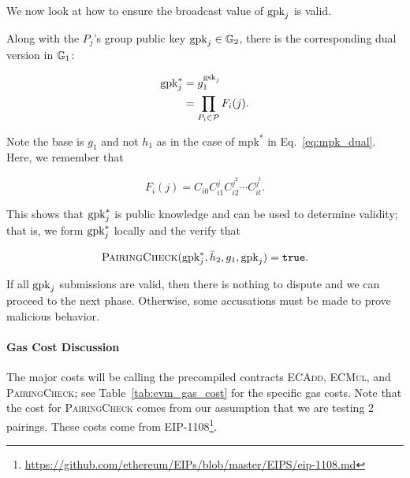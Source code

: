 \subsubsection{\GPKDispute{}}
\label{sssec:gpkj_dispute}
We now look at how to ensure the broadcast value of
$\textrm{gpk}_{j}$ is valid.

Along with the $P_{j}$'s group public key $\textrm{gpk}_{j}\in\mathbb{G}_{2}$,
there is the corresponding dual version in $\mathbb{G}_{1}$:

\begin{align}
    \textrm{gpk}_{j}^{*} &= g_{1}^{\textrm{gsk}_{j}}
            \nonumber\\
        &= \prod_{P_{i}\in\mathcal{P}}F_{i}(j).
    \label{eq:gpkj_star_def}
\end{align}

\noindent
Note the base is $g_{1}$ and not $h_{1}$ as in the case of $\text{mpk}^{*}$
in Eq.~\eqref{eq:mpk_dual}.
Here, we remember that

\begin{equation}
    F_{i}(j) = C_{i0}C_{i1}^{j}C_{i2}^{j^{2}}\cdots C_{it}^{j^{t}}.
    \label{eq:Fij_def}
\end{equation}

\noindent
This shows that $\textrm{gpk}_{j}^{*}$ is public knowledge
and can be used to determine validity;
that is, we form $\textrm{gpk}_{j}^{*}$ locally and the verify that

\begin{equation}
    \textsc{PairingCheck}(\textrm{gpk}_{j}^{*}, \bar{h}_{2}, g_{1}, \textrm{gpk}_{j})
        = \texttt{true}.
\end{equation}

\noindent
If all $\textrm{gpk}_{j}$ submissions are valid,
then there is nothing to dispute and we can proceed to the next phase.
Otherwise, some accusations must be made to prove malicious behavior.

\paragraph{Gas Cost Discussion}
The major costs will be calling the precompiled contracts
\textsc{ECAdd}, \textsc{ECMul}, and \textsc{PairingCheck};
see Table~\ref{tab:evm_gas_cost} for the specific gas costs.
Note that the cost for \textsc{PairingCheck} comes
from our assumption that we are testing 2 pairings.
These costs come from EIP-1108\footnote{
    \url{https://github.com/ethereum/EIPs/blob/master/EIPS/eip-1108.md}}.





